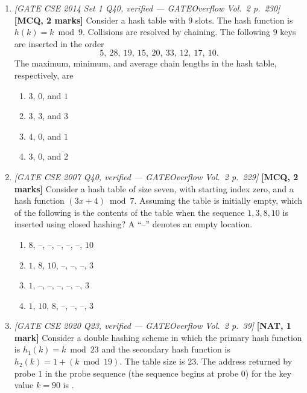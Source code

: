 \documentclass[11pt]{article}
\begin{document}
\begin{enumerate}
\item[\textbf{Q3}] \textit{[GATE CSE 2014 Set 1 Q40, verified --- GATEOverflow Vol.~2 p.~230]} \textbf{[MCQ, 2 marks]} Consider a hash table with $9$ slots. The hash function is $h(k)=k \bmod 9$. Collisions are resolved by chaining. The following $9$ keys are inserted in the order
\[
5,\ 28,\ 19,\ 15,\ 20,\ 33,\ 12,\ 17,\ 10.
\]
The maximum, minimum, and average chain lengths in the hash table, respectively, are
\begin{enumerate}
  \item[(A)] $3$, $0$, and $1$
  \item[(B)] $3$, $3$, and $3$
  \item[(C)] $4$, $0$, and $1$
  \item[(D)] $3$, $0$, and $2$
\end{enumerate}

\item[\textbf{Q4}] \textit{[GATE CSE 2007 Q40, verified --- GATEOverflow Vol.~2 p.~229]} \textbf{[MCQ, 2 marks]} Consider a hash table of size seven, with starting index zero, and a hash function $(3x+4) \bmod 7$. Assuming the table is initially empty, which of the following is the contents of the table when the sequence $1,3,8,10$ is inserted using closed hashing? A ``--'' denotes an empty location.
\begin{enumerate}
  \item[(A)] $8$, --, --, --, --, --, $10$
  \item[(B)] $1$, $8$, $10$, --, --, --, $3$
  \item[(C)] $1$, --, --, --, --, --, $3$
  \item[(D)] $1$, $10$, $8$, --, --, --, $3$
\end{enumerate}

\item[\textbf{Q5}] \textit{[GATE CSE 2020 Q23, verified --- GATEOverflow Vol.~2 p.~39]} \textbf{[NAT, 1 mark]} Consider a double hashing scheme in which the primary hash function is $h_1(k)=k \bmod 23$ and the secondary hash function is $h_2(k)=1+(k \bmod 19)$. The table size is $23$. The address returned by probe $1$ in the probe sequence (the sequence begins at probe $0$) for the key value $k=90$ is \underline{\hspace{1.5cm}}.


\end{enumerate}
\end{document}
